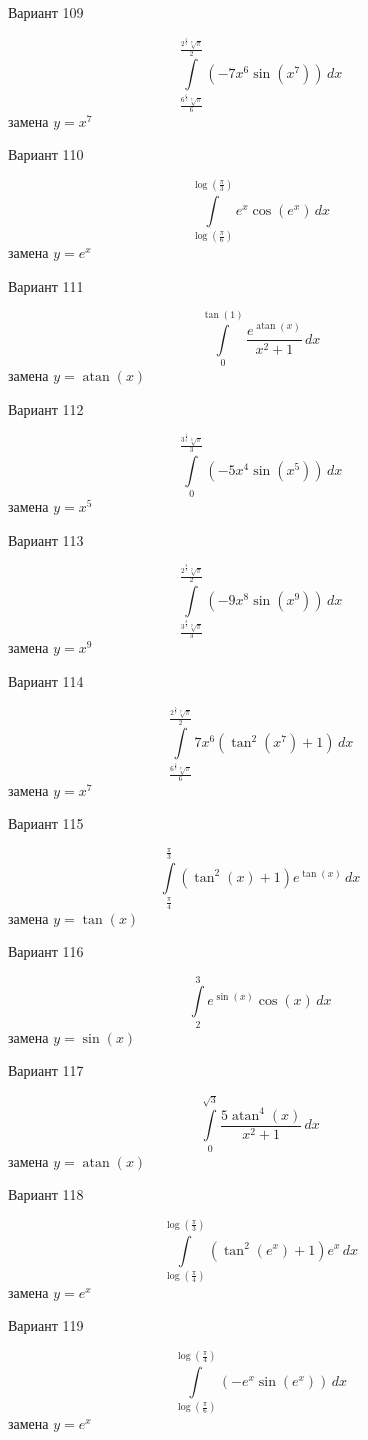 \documentclass[11pt]{report}
\begin{document}
Вариант 109

$$\int\limits_{\frac{6^{\frac{6}{7}} \sqrt[7]{\pi}}{6}}^{\frac{2^{\frac{5}{7}} \sqrt[7]{\pi}}{2}} \left(- 7 x^{6} \sin{\left(x^{7} \right)}\right)\, dx$$
замена $y = x^{7}$

Вариант 110

$$\int\limits_{\log{\left(\frac{\pi}{6} \right)}}^{\log{\left(\frac{\pi}{3} \right)}} e^{x} \cos{\left(e^{x} \right)}\, dx$$
замена $y = e^{x}$

Вариант 111

$$\int\limits_{0}^{\tan{\left(1 \right)}} \frac{e^{\operatorname{atan}{\left(x \right)}}}{x^{2} + 1}\, dx$$
замена $y = \operatorname{atan}{\left(x \right)}$

Вариант 112

$$\int\limits_{0}^{\frac{3^{\frac{4}{5}} \sqrt[5]{\pi}}{3}} \left(- 5 x^{4} \sin{\left(x^{5} \right)}\right)\, dx$$
замена $y = x^{5}$

Вариант 113

$$\int\limits_{\frac{3^{\frac{8}{9}} \sqrt[9]{\pi}}{3}}^{\frac{2^{\frac{8}{9}} \sqrt[9]{\pi}}{2}} \left(- 9 x^{8} \sin{\left(x^{9} \right)}\right)\, dx$$
замена $y = x^{9}$

Вариант 114

$$\int\limits_{\frac{6^{\frac{6}{7}} \sqrt[7]{\pi}}{6}}^{\frac{2^{\frac{5}{7}} \sqrt[7]{\pi}}{2}} 7 x^{6} \left(\tan^{2}{\left(x^{7} \right)} + 1\right)\, dx$$
замена $y = x^{7}$

Вариант 115

$$\int\limits_{\frac{\pi}{4}}^{\frac{\pi}{3}} \left(\tan^{2}{\left(x \right)} + 1\right) e^{\tan{\left(x \right)}}\, dx$$
замена $y = \tan{\left(x \right)}$

Вариант 116

$$\int\limits_{2}^{3} e^{\sin{\left(x \right)}} \cos{\left(x \right)}\, dx$$
замена $y = \sin{\left(x \right)}$

Вариант 117

$$\int\limits_{0}^{\sqrt{3}} \frac{5 \operatorname{atan}^{4}{\left(x \right)}}{x^{2} + 1}\, dx$$
замена $y = \operatorname{atan}{\left(x \right)}$

Вариант 118

$$\int\limits_{\log{\left(\frac{\pi}{4} \right)}}^{\log{\left(\frac{\pi}{3} \right)}} \left(\tan^{2}{\left(e^{x} \right)} + 1\right) e^{x}\, dx$$
замена $y = e^{x}$

Вариант 119

$$\int\limits_{\log{\left(\frac{\pi}{6} \right)}}^{\log{\left(\frac{\pi}{4} \right)}} \left(- e^{x} \sin{\left(e^{x} \right)}\right)\, dx$$
замена $y = e^{x}$
\end{document}
